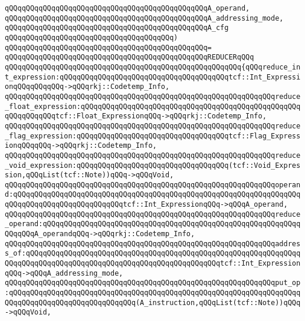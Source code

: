\verb|qQQqqQQqqQQqqQQqqQQqqQQqqQQqqQQqqQQqqQQqqQQqqQQqA_operand,|\newline
\verb|qQQqqQQqqQQqqQQqqQQqqQQqqQQqqQQqqQQqqQQqqQQqqQQqA_addressing_mode,|\newline
\verb|qQQqqQQqqQQqqQQqqQQqqQQqqQQqqQQqqQQqqQQqqQQqqQQqA_cfg|\newline
\verb|qQQqqQQqqQQqqQQqqQQqqQQqqQQqqQQqqQQqqQQq)|\newline
\verb|qQQqqQQqqQQqqQQqqQQqqQQqqQQqqQQqqQQqqQQqqQQqqQQq=|\newline
\verb|qQQqqQQqqQQqqQQqqQQqqQQqqQQqqQQqqQQqqQQqqQQqqQQqREDUCERqQQq|\newline
\verb|qQQqqQQqqQQqqQQqqQQqqQQqqQQqqQQqqQQqqQQqqQQqqQQqqQQqqQQq{qQQqreduce_int_expression:qQQqqQQqqQQqqQQqqQQqqQQqqQQqqQQqqQQqqQQqtcf::Int_ExpressionqQQqqQQqqQQq->qQQqrkj::Codetemp_Info,|\newline
\verb|qQQqqQQqqQQqqQQqqQQqqQQqqQQqqQQqqQQqqQQqqQQqqQQqqQQqqQQqqQQqqQQqreduce_float_expression:qQQqqQQqqQQqqQQqqQQqqQQqqQQqqQQqqQQqqQQqqQQqqQQqqQQqqQQqqQQqqQQqtcf::Float_ExpressionqQQq->qQQqrkj::Codetemp_Info,|\newline
\newline
\verb|qQQqqQQqqQQqqQQqqQQqqQQqqQQqqQQqqQQqqQQqqQQqqQQqqQQqqQQqqQQqqQQqreduce_flag_expression:qQQqqQQqqQQqqQQqqQQqqQQqqQQqqQQqqQQqtcf::Flag_ExpressionqQQqqQQq->qQQqrkj::Codetemp_Info,|\newline
\verb|qQQqqQQqqQQqqQQqqQQqqQQqqQQqqQQqqQQqqQQqqQQqqQQqqQQqqQQqqQQqqQQqreduce_void_expression:qQQqqQQqqQQqqQQqqQQqqQQqqQQqqQQqqQQq(tcf::Void_Expression,qQQqList(tcf::Note))qQQq->qQQqVoid,|\newline
\newline
\verb|qQQqqQQqqQQqqQQqqQQqqQQqqQQqqQQqqQQqqQQqqQQqqQQqqQQqqQQqqQQqqQQqoperand:qQQqqQQqqQQqqQQqqQQqqQQqqQQqqQQqqQQqqQQqqQQqqQQqqQQqqQQqqQQqqQQqqQQqqQQqqQQqqQQqqQQqqQQqqQQqqQQqtcf::Int_ExpressionqQQq->qQQqA_operand,|\newline
\verb|qQQqqQQqqQQqqQQqqQQqqQQqqQQqqQQqqQQqqQQqqQQqqQQqqQQqqQQqqQQqqQQqreduce_operand:qQQqqQQqqQQqqQQqqQQqqQQqqQQqqQQqqQQqqQQqqQQqqQQqqQQqqQQqqQQqqQQqqQQqA_operandqQQq->qQQqrkj::Codetemp_Info,|\newline
\newline
\verb|qQQqqQQqqQQqqQQqqQQqqQQqqQQqqQQqqQQqqQQqqQQqqQQqqQQqqQQqqQQqqQQqaddress_of:qQQqqQQqqQQqqQQqqQQqqQQqqQQqqQQqqQQqqQQqqQQqqQQqqQQqqQQqqQQqqQQqqQQqqQQqqQQqqQQqqQQqqQQqqQQqqQQqqQQqqQQqqQQqqQQqqQQqtcf::Int_ExpressionqQQq->qQQqA_addressing_mode,|\newline
\verb|qQQqqQQqqQQqqQQqqQQqqQQqqQQqqQQqqQQqqQQqqQQqqQQqqQQqqQQqqQQqqQQqput_op:qQQqqQQqqQQqqQQqqQQqqQQqqQQqqQQqqQQqqQQqqQQqqQQqqQQqqQQqqQQqqQQqqQQqqQQqqQQqqQQqqQQqqQQqqQQqqQQqqQQq(A_instruction,qQQqList(tcf::Note))qQQq->qQQqVoid,|\newline
